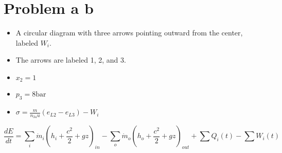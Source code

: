 \section*{Problem a b}
\begin{itemize}
    \item A circular diagram with three arrows pointing outward from the center, labeled \( W_i \).
    \item The arrows are labeled 1, 2, and 3.
    \item \( x_2 = 1 \)
    \item \( p_3 = 8 \text{bar} \)
    \item \( \sigma = \frac{m}{n_{34}u} (e_{L2} - e_{L3}) - W_i \)
\end{itemize}

\[
\frac{dE}{dt} = \sum_i \dot{m}_i (h_i + \frac{c^2}{2} + gz)_{in} - \sum_o \dot{m}_o (h_o + \frac{c^2}{2} + gz)_{out} + \sum Q_i(t) - \sum W_i(t)
\]